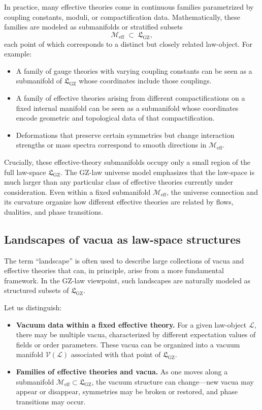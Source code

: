 \documentclass[11pt]{book}
\newcommand{\GZLS}{\ensuremath{\mathfrak{L}_{\mathrm{GZ}}}}
\theoremstyle{plain}
\theoremstyle{definition}
\theoremstyle{remark}
\begin{document}
In practice, many effective theories come in continuous families
parametrized by coupling constants, moduli, or compactification
data. Mathematically, these families are modeled as submanifolds or
stratified subsets
\[
   \mathcal{M}_{\mathrm{eff}} \;\subset\; \GZLS,
\]
each point of which corresponds to a distinct but closely related
law-object. For example:

\begin{itemize}
  \item A family of gauge theories with varying coupling constants
        can be seen as a submanifold of $\GZLS$ whose coordinates
        include those couplings.
  \item A family of effective theories arising from different
        compactifications on a fixed internal manifold can be seen
        as a submanifold whose coordinates encode geometric and
        topological data of that compactification.
  \item Deformations that preserve certain symmetries but change
        interaction strengths or mass spectra correspond to smooth
        directions in $\mathcal{M}_{\mathrm{eff}}$.
\end{itemize}

Crucially, these effective-theory submanifolds occupy only a small
region of the full law-space $\GZLS$. The GZ-law universe model
emphasizes that the law-space is much larger than any particular
class of effective theories currently under consideration. Even
within a fixed submanifold $\mathcal{M}_{\mathrm{eff}}$, the
universe connection and its curvature organize how different
effective theories are related by flows, dualities, and phase
transitions.

\subsection{Landscapes of vacua as law-space structures}
\label{subsec:vacua-landscapes-lawspace}


The term ``landscape'' is often used to describe large collections
of vacua and effective theories that can, in principle, arise from a
more fundamental framework. In the GZ-law viewpoint, such
landscapes are naturally modeled as structured subsets of $\GZLS$.

Let us distinguish:

\begin{itemize}
  \item \textbf{Vacuum data within a fixed effective theory.}
        For a given law-object $\mathcal{L}$, there may be multiple
        vacua, characterized by different expectation values of
        fields or order parameters. These vacua can be organized into
        a vacuum manifold $\mathcal{V}(\mathcal{L})$ associated with
        that point of $\GZLS$.
  \item \textbf{Families of effective theories and vacua.}
        As one moves along a submanifold
        $\mathcal{M}_{\mathrm{eff}} \subset \GZLS$, the vacuum
        structure can change—new vacua may appear or disappear,
        symmetries may be broken or restored, and phase transitions
        may occur.
\end{itemize}
\end{document}
